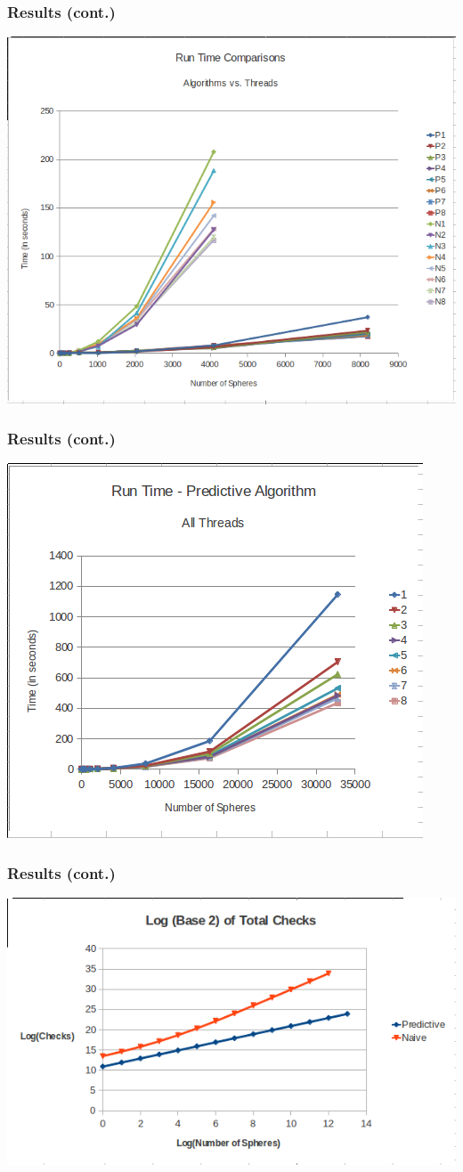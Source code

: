 \documentclass{beamer}
\begin{document}
\begin{frame}
	\frametitle{Results (cont.)}
	\begin{center}
		\includegraphics[width=.75\textwidth]{runtime_comparison.png}
	\end{center}
\end{frame}

\begin{frame}
	\frametitle{Results (cont.)}
	\begin{center}
		\includegraphics[width=.75\textwidth]{runtime_predictive_allthreads.png}
	\end{center}
\end{frame}

\begin{frame}
	\frametitle{Results (cont.)}
	\begin{center}
		\includegraphics[width=.75\textwidth]{log_total_checks_comparison.png}
	\end{center}
\end{frame}
\end{document}
